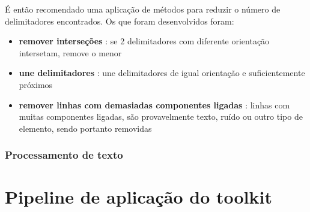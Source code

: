 
É então recomendado uma aplicação de métodos para reduzir o número de delimitadores encontrados.
Os que foram desenvolvidos foram:

\begin{itemize}\setlength\itemsep{-0.3em}
	\item \textbf{remover interseções} : se 2 delimitadores com diferente orientação intersetam, remove o menor
	\item \textbf{une delimitadores} : une delimitadores de igual orientação e suficientemente próximos
	\item \textbf{remover linhas com demasiadas componentes ligadas} : linhas com muitas componentes ligadas, são provavelmente texto, ruído ou outro tipo de elemento, sendo portanto removidas
\end{itemize}





\label{contribution_image_document_image_identification}


\label{contribution_image_segmentation}





\subsubsection{Processamento de texto}
\label{contribution_text_processing}






\section{Pipeline de aplicação do toolkit}
\label{contribution_toolkit_pipeline}




